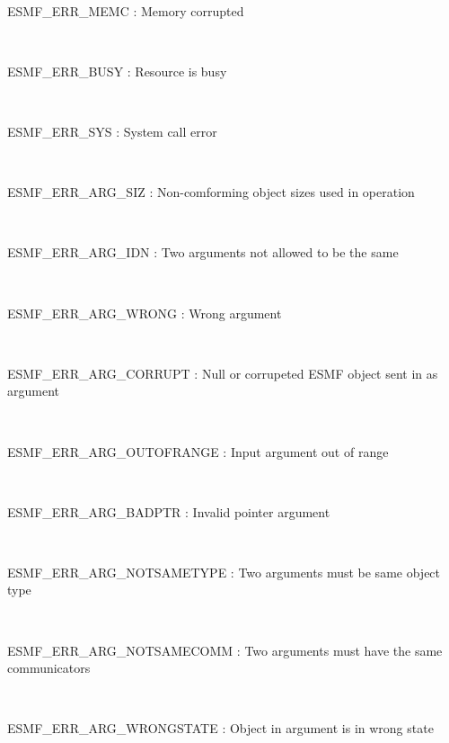 \mbox{}\hrulefill\ 
 

  ESMF\_ERR\_MEMC : Memory corrupted 
 
\mbox{}\hrulefill\ 
 

  ESMF\_ERR\_BUSY : Resource is busy 
 
\mbox{}\hrulefill\ 
 

  ESMF\_ERR\_SYS : System call error 
 
\mbox{}\hrulefill\ 
 

  ESMF\_ERR\_ARG\_SIZ : Non-comforming object sizes used in operation 
 
\mbox{}\hrulefill\ 
 

  ESMF\_ERR\_ARG\_IDN : Two arguments not allowed to be the same 
 
\mbox{}\hrulefill\ 
 

  ESMF\_ERR\_ARG\_WRONG : Wrong argument 
 
\mbox{}\hrulefill\ 
 

  ESMF\_ERR\_ARG\_CORRUPT : Null or corrupeted ESMF object sent in as argument 
 
\mbox{}\hrulefill\ 
 

  ESMF\_ERR\_ARG\_OUTOFRANGE : Input argument out of range 
 
\mbox{}\hrulefill\ 
 

  ESMF\_ERR\_ARG\_BADPTR : Invalid pointer argument 
 
\mbox{}\hrulefill\ 
 

  ESMF\_ERR\_ARG\_NOTSAMETYPE : Two arguments must be same object type 
 
\mbox{}\hrulefill\ 
 

  ESMF\_ERR\_ARG\_NOTSAMECOMM : Two arguments must have the same communicators 
 
\mbox{}\hrulefill\ 
 

  ESMF\_ERR\_ARG\_WRONGSTATE : Object in argument is in wrong state 
 
